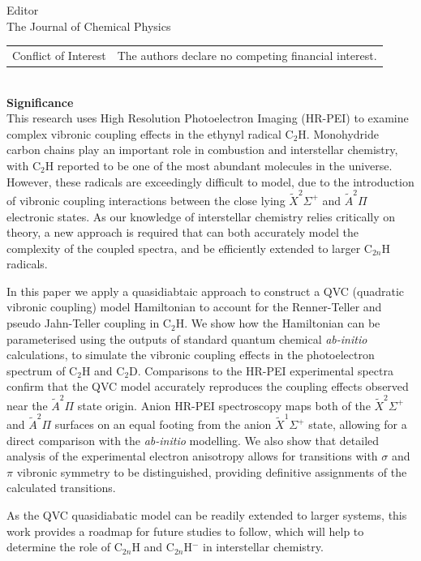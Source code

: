 \documentclass[a4paper,12pt]{letter}
\begin{document}
\begin{sf}
\begin{letter}{%
Editor\\
The Journal of Chemical Physics
}
\begin{tabularx}{.95\textwidth}{ll}
\\
\parbox[t]{6em}{
Conflict of Interest} &
\hspace*{.4em}The authors declare no competing financial interest.
\end{tabularx}

\vspace*{0ex}\ \\
\textbf{Significance}\\[.5ex]
This research uses High Resolution Photoelectron Imaging (HR-PEI) to examine complex vibronic coupling effects in the ethynyl radical C$_2$H. Monohydride carbon chains play an important role in combustion and interstellar chemistry, with C$_2$H reported to be one of the most abundant molecules in the universe. However, these radicals are exceedingly difficult to model, due to the introduction of vibronic coupling interactions between the close lying $\tilde{X}^2\Sigma^+$ and $\tilde{A}^2\Pi$ electronic states. As our knowledge of interstellar chemistry relies critically on theory, a new approach is required that can both accurately model the complexity of the coupled spectra, and be efficiently extended to larger C$_{2n}$H radicals.

In this paper we apply a quasidiabtaic approach to construct a QVC (quadratic vibronic coupling) model Hamiltonian to account for the Renner-Teller and pseudo Jahn-Teller coupling in C$_2$H. We show how the Hamiltonian can be parameterised using the outputs of standard quantum chemical \emph{ab-initio} calculations, to simulate the vibronic coupling effects in the photoelectron spectrum of C$_2$H and C$_2$D.  Comparisons to the HR-PEI experimental spectra confirm that the QVC model accurately reproduces the coupling effects observed near the $\tilde{A}^2\Pi$ state origin. Anion HR-PEI spectroscopy maps both of the $\tilde{X}^2\Sigma^+$ and $\tilde{A}^2\Pi$ surfaces on an equal footing from the anion $\tilde{X}^1\Sigma^+$ state, allowing for a direct comparison with the \emph{ab-initio} modelling. We also show that detailed analysis of the experimental electron anisotropy allows for transitions with $\sigma$ and $\pi$ vibronic symmetry to be distinguished, providing definitive assignments of the calculated transitions.


As the QVC quasidiabatic model can be readily extended to larger systems, this work provides a roadmap for future studies to follow, which will help to determine the role of C$_{2n}$H and C$_{2n}$H$^-$ in interstellar chemistry.


\end{letter}
\end{sf}
\end{document}
